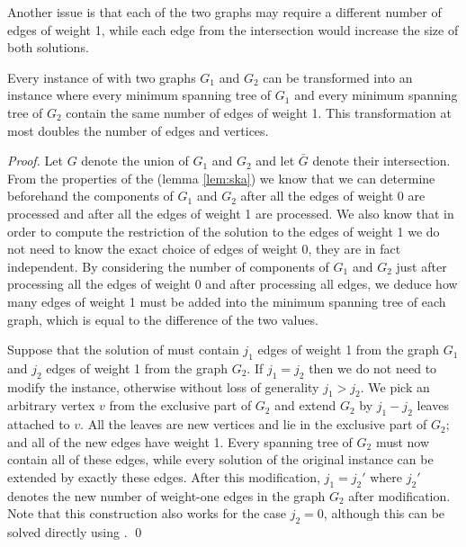 Another issue is that each of the two graphs may require a different number of edges of weight 1, while each edge from the intersection would increase the size of both solutions. 

\begin{observation}\label{obs:OIsamesizesolutions}
Every instance of \OISMST with two graphs $G_1$ and $G_2$ can be transformed into an instance where every minimum spanning tree of $G_1$ and every minimum spanning tree of $G_2$ contain the same number of edges of weight 1. This transformation at most doubles the number of edges and vertices. 
\end{observation}
\begin{proof}
Let $G$ denote the union of $G_1$ and $G_2$ and let $\bar{G}$ denote their intersection. From the properties of the \SKA (lemma \ref{lem:ska}) we know that we can determine beforehand the components of $G_1$ and $G_2$ after all the edges of weight 0 are processed and after all the edges of weight 1 are processed. We also know that in order to compute the restriction of the solution to the edges of weight 1 we do not need to know the exact choice of edges of weight 0, they are in fact independent. By considering the number of components of $G_1$ and $G_2$ just after processing all the edges of weight 0 and after processing all edges, we deduce how many edges of weight 1 must be added into the minimum spanning tree of each graph, which is equal to the difference of the two values. 

Suppose that the solution of \OISMST must contain $j_1$ edges of weight 1 from the graph $G_1$ and $j_2$ edges of weight 1 from the graph $G_2$. If $j_1 = j_2$ then we do not need to modify the instance, otherwise without loss of generality $j_1 > j_2$. We pick an arbitrary vertex $v$ from the exclusive part of $G_2$ and extend $G_2$ by $j_1-j_2$ leaves attached to $v$. All the leaves are new vertices and lie in the exclusive part of $G_2$; and all of the new edges have weight 1. Every spanning tree of $G_2$ must now contain all of these edges, while every solution of the original instance can be extended by exactly these edges. After this modification, $j_1 = j_2'$ where $j_2'$ denotes the new number of weight-one edges in the graph $G_2$ after modification. Note that this construction also works for the case  $j_2 = 0$, although this can be solved directly using \SKA. \qed
\end{proof}

